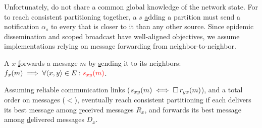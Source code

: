 Unfortunately, \processes do not share a common global knowledge of
the network state. For \processes to reach consistent partitioning
together, a \Process $s$ \underline{a}dding a partition must send a
notification $\alpha_s$ to every \process that is closer to it than
any other source. Since epidemic dissemination and scoped broadcast
have well-aligned objectives, we assume implementations relying on
message forwarding from neighbor-to-neighbor.

\begin{definition}
  A \process $x$ \underline{f}orwards a message $m$ by
  \underline{s}ending it to its neighbors:
  $f_x(m) \implies \forall \langle x, y\rangle \in E:
  \textcolor{red}{s_{xy}(m)}$.
\end{definition}

\begin{theorem}
    Assuming reliable communication links ($s_{xy}(m) \iff \square\,
    r_{yx}(m)$), and a total order on messages ($<$), \processes
    eventually reach consistent partitioning if each \process delivers
    its best message among \underline{r}eceived messages $R_x$, and
    forwards its best message among \underline{d}elivered messages
    $D_x$.
\end{theorem}

